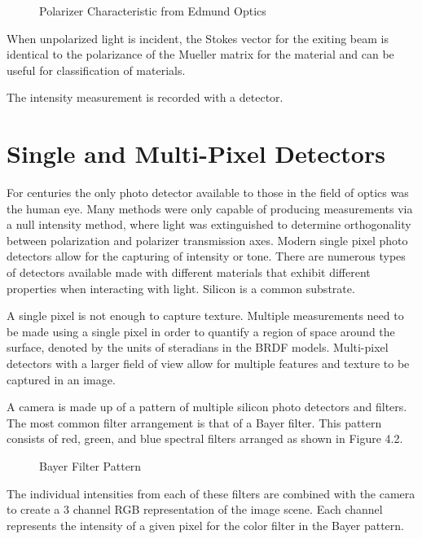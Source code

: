 \begin{figure}[!htb]
    \begin{center}
    \end{center}
    \caption{Polarizer Characteristic from Edmund Optics}
    \label{fig:polarization}
\end{figure}
When unpolarized light is incident, the Stokes vector for the exiting beam is identical to the polarizance of the Mueller matrix for the material and can be useful for classification of materials.

The intensity measurement is recorded with a detector.

\section{Single and Multi-Pixel Detectors}
For centuries the only photo detector available to those in the field of optics was the human eye.  Many methods were only capable of producing measurements via a null intensity method, where light was extinguished to determine orthogonality between polarization and polarizer transmission axes.  Modern single pixel photo detectors allow for the capturing of intensity or tone.  There are numerous types of detectors available made with different materials that exhibit different properties when interacting with light.  Silicon is a common substrate.

A single pixel is not enough to capture texture.  Multiple measurements need to be made using a single pixel in order to quantify a region of space around the surface, denoted by the units of steradians in the BRDF models.  Multi-pixel detectors with a larger field of view allow for multiple features and texture to be captured in an image.

A camera is made up of a pattern of multiple silicon photo detectors and filters.  The most common filter arrangement is that of a Bayer filter.  This pattern consists of red, green, and blue spectral filters arranged as shown in Figure 4.2.
\begin{figure}[!htb]
    \begin{center}
    \end{center}
    \caption{Bayer Filter Pattern}
    \label{fig:polarization}
\end{figure}
%
The individual intensities from each of these filters are combined with the camera to create a 3 channel RGB representation of the image scene.  Each channel represents the intensity of a given pixel for the color filter in the Bayer pattern.

